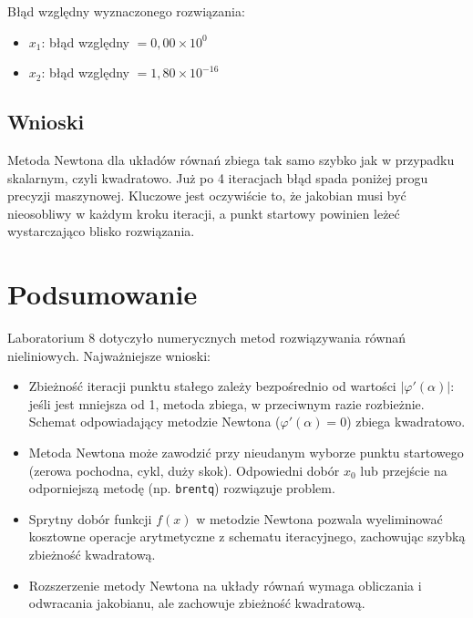 \documentclass[12pt, a4paper]{article}
\begin{document}
Błąd względny wyznaczonego rozwiązania:
\begin{itemize}
  \item $x_1$: błąd względny $= 0{,}00 \times 10^{0}$
  \item $x_2$: błąd względny $= 1{,}80 \times 10^{-16}$
\end{itemize}

\subsection{Wnioski}

Metoda Newtona dla układów równań zbiega tak samo szybko jak w przypadku skalarnym, czyli kwadratowo. Już po 4 iteracjach błąd spada poniżej progu precyzji maszynowej. Kluczowe jest oczywiście to, że jakobian musi być nieosobliwy w każdym kroku iteracji, a punkt startowy powinien leżeć wystarczająco blisko rozwiązania.

\section{Podsumowanie}

Laboratorium 8 dotyczyło numerycznych metod rozwiązywania równań nieliniowych. Najważniejsze wnioski:

\begin{itemize}
  \item Zbieżność iteracji punktu stałego zależy bezpośrednio od wartości $|\varphi'(\alpha)|$: jeśli jest mniejsza od 1, metoda zbiega, w przeciwnym razie rozbieżnie. Schemat odpowiadający metodzie Newtona ($\varphi'(\alpha) = 0$) zbiega kwadratowo.
  \item Metoda Newtona może zawodzić przy nieudanym wyborze punktu startowego (zerowa pochodna, cykl, duży skok). Odpowiedni dobór $x_0$ lub przejście na odporniejszą metodę (np. \texttt{brentq}) rozwiązuje problem.
  \item Sprytny dobór funkcji $f(x)$ w metodzie Newtona pozwala wyeliminować kosztowne operacje arytmetyczne z schematu iteracyjnego, zachowując szybką zbieżność kwadratową.
  \item Rozszerzenie metody Newtona na układy równań wymaga obliczania i odwracania jakobianu, ale zachowuje zbieżność kwadratową.
\end{itemize}
\end{document}
